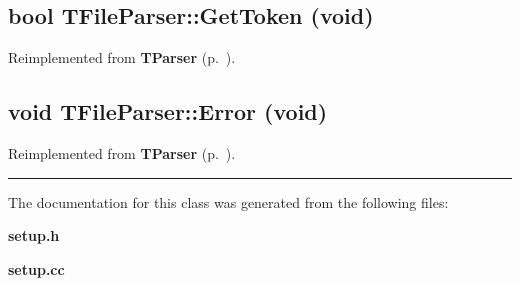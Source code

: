 \subsection{\setlength{\rightskip}{0pt plus 5cm}bool TFile\-Parser::Get\-Token (void)\hspace{0.3cm}{\tt  [virtual]}}



Reimplemented from {\bf TParser} {\rm (p.~\pageref{TParser_a2})}.\label{TFileParser_a2}
\subsection{\setlength{\rightskip}{0pt plus 5cm}void TFile\-Parser::Error (void)\hspace{0.3cm}{\tt  [virtual]}}



Reimplemented from {\bf TParser} {\rm (p.~\pageref{TParser_a3})}.\vspace{0.4cm}\hrule\vspace{0.2cm}
The documentation for this class was generated from the following files:\begin{CompactItemize}
\item 
{\bf setup.h}\item 
{\bf setup.cc}\end{CompactItemize}
